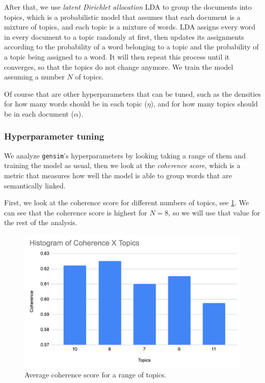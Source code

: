 \documentclass[conference, onecolumn]{IEEEtran}
\begin{document}
After that, we use \textit{latent Dirichlet allocation} LDA to group the
documents into topics, which is a probabilistic model that assumes that each
document is a mixture of topics, and each topic is a mixture of words.
LDA assigns every word in every document to a topic randomly at first, then
updates its assignments according to the probability of a word belonging to a
topic and the probability of a topic being assigned to a word.
It will then repeat this process until it converges, so that the topics do not
change anymore.
We train the model assuming a number $N$ of topics.

Of course that are other hyperparameters that can be tuned, such as the
densities for how many words should be in each topic ($\eta$), and for how many
topics should be in each document ($\alpha$).

\subsubsection{Hyperparameter tuning} \label{sec:methodology:statistics-hyper}

We analyze \verb|gensim|'s hyperparameters by looking taking a range of them
and training the model as usual, then we look at the \textit{coherence score},
which is a metric that measures how well the model is able to group words that
are semantically linked.

First, we look at the coherence score for different numbers of topics, see
\cref{fig:coherenceXtopics}.
We can see that the coherence score is highest for $N = 8$, so we will use that
value for the rest of the analysis.

\begin{figure}[H]
    \centering
    \includegraphics[width=0.7\linewidth]{coherenceXtopics.png}
    \caption{Average coherence score for a range of topics.}
    \label{fig:coherenceXtopics}
\end{figure}
\end{document}

